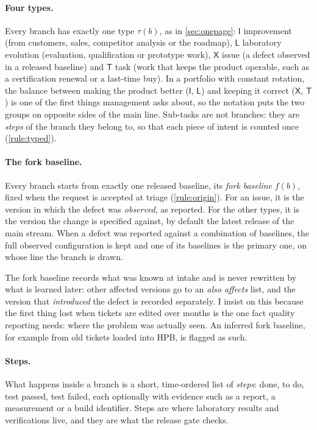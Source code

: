 \paragraph{Four types.}
Every branch has exactly one type $\tau(b)$, as in \cref{sec:onepage}:
$\mathsf{I}$ improvement (from customers, sales, competitor analysis or the
roadmap), $\mathsf{L}$ laboratory evolution (evaluation, qualification or
prototype work), $\mathsf{X}$ issue (a defect observed in a released
baseline) and $\mathsf{T}$ task (work that keeps the product operable, such
as a certification renewal or a last-time buy). In a portfolio with
constant rotation, the balance between making the product better
($\mathsf{I}$, $\mathsf{L}$) and keeping it correct ($\mathsf{X}$,
$\mathsf{T}$) is one of the first things management asks about, so the
notation puts the two groups on opposite sides of the main line.
Sub-tasks are not branches: they are \emph{steps} of the branch they
belong to, so that each piece of intent is counted once (\cref{rule:typed}).

\paragraph{The fork baseline.}
Every branch starts from exactly one released baseline, its \emph{fork
baseline} $f(b)$, fixed when the request is accepted at triage
(\cref{rule:origin}). For an issue, it is the version in which the defect
was \emph{observed}, as reported. For the other types, it is the version
the change is specified against, by default the latest release of the main
stream. When a defect was reported against a combination of baselines,
the full observed configuration is kept and one of its baselines is the
primary one, on whose line the branch is drawn.

The fork baseline records what was known at intake and is never
rewritten by what is learned later: other affected versions go to an
\emph{also affects} list, and the version that \emph{introduced} the
defect is recorded separately. I insist on this because the first thing
lost when tickets are edited over months is the one fact quality
reporting needs: where the problem was actually seen. An inferred fork
baseline, for example from old tickets loaded into HPB, is flagged as
such.

\paragraph{Steps.}
What happens inside a branch is a short, time-ordered list of
\emph{steps}: done, to do, test passed, test failed, each optionally with
evidence such as a report, a measurement or a build identifier. Steps are
where laboratory results and verifications live, and they are what the
release gate checks.

